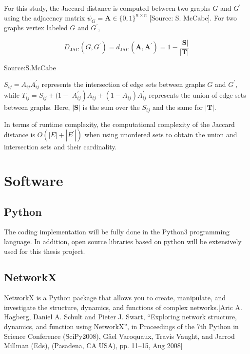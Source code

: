 For this study, the Jaccard distance is computed between two graphs $G$ and $G^{\prime}$ using the adjacency matrix $\psi_{G}=\mathbf{A} \in\{0,1\}^{n \times n}$ [Source: S. McCabe]. For two graphs vertex labeled $G$ and $G^{\prime}$,

\begin{equation}
D_{\mathrm{JAC}}\left(G, G^{\prime}\right)=d_{\mathrm{JAC}}\left(\mathbf{A}, \mathbf{A}^{\prime}\right)=1-\frac{|\mathbf{S}|}{|\mathbf{T}|}
\end{equation}
\caption{Source:S.McCabe}

$S_{i j}=A_{i j} A_{i j}^{\prime}$ represents the intersection of edge sets between graphs $G$ and $G^{\prime}$, while $T_{i j}=S_{i j}+(1-$ $\left.A_{i j}^{\prime}\right) A_{i j}+\left(1-A_{i j}\right) A_{i j}^{\prime}$ represents the union of edge sets between graphs. Here, $|\mathbf{S}|$ is the sum over the $S_{i j}$ and the same for $|\mathbf{T}|$. 

In terms of runtime complexity, the computational complexity of the Jaccard distance is $O\left(|E|+\left|E^{\prime}\right|\right)$ when using unordered sets to obtain the union and intersection sets and their cardinality.

\section{Software}
\subsection{Python}
The coding implementation will be fully done in the Python3 programming language. In addition, open source libraries based on python will be extensively used for this thesis project.

\subsection{NetworkX}
NetworkX is a Python package that allows you to create, manipulate, and investigate the structure, dynamics, and functions of complex networks.[Aric A. Hagberg, Daniel A. Schult and Pieter J. Swart, “Exploring network structure, dynamics, and function using NetworkX”, in Proceedings of the 7th Python in Science Conference (SciPy2008), Gäel Varoquaux, Travis Vaught, and Jarrod Millman (Eds), (Pasadena, CA USA), pp. 11–15, Aug 2008]

